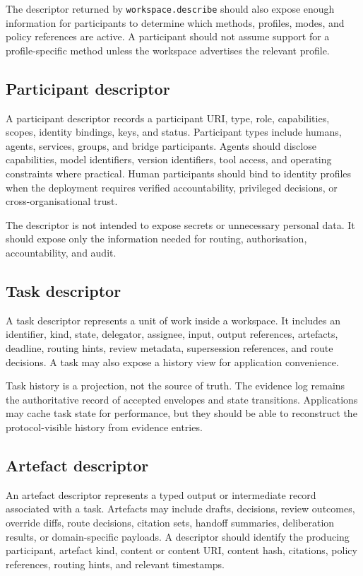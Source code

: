 \documentclass[11pt]{article}
\begin{document}
The descriptor returned by \texttt{workspace.describe} should also expose enough information for participants to determine which methods, profiles, modes, and policy references are active. A participant should not assume support for a profile-specific method unless the workspace advertises the relevant profile.

\subsection{Participant descriptor}

A participant descriptor records a participant URI, type, role, capabilities, scopes, identity bindings, keys, and status. Participant types include humans, agents, services, groups, and bridge participants. Agents should disclose capabilities, model identifiers, version identifiers, tool access, and operating constraints where practical. Human participants should bind to identity profiles when the deployment requires verified accountability, privileged decisions, or cross-organisational trust.

The descriptor is not intended to expose secrets or unnecessary personal data. It should expose only the information needed for routing, authorisation, accountability, and audit.

\subsection{Task descriptor}

A task descriptor represents a unit of work inside a workspace. It includes an identifier, kind, state, delegator, assignee, input, output references, artefacts, deadline, routing hints, review metadata, supersession references, and route decisions. A task may also expose a history view for application convenience.

Task history is a projection, not the source of truth. The evidence log remains the authoritative record of accepted envelopes and state transitions. Applications may cache task state for performance, but they should be able to reconstruct the protocol-visible history from evidence entries.

\subsection{Artefact descriptor}

An artefact descriptor represents a typed output or intermediate record associated with a task. Artefacts may include drafts, decisions, review outcomes, override diffs, route decisions, citation sets, handoff summaries, deliberation results, or domain-specific payloads. A descriptor should identify the producing participant, artefact kind, content or content URI, content hash, citations, policy references, routing hints, and relevant timestamps.
\end{document}
